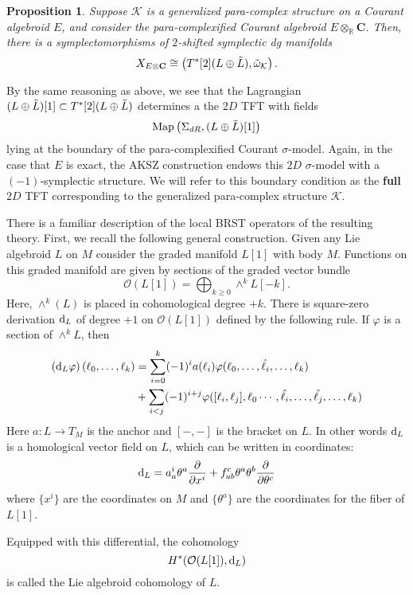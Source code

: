 \documentclass[letterpaper,12pt]{article}
\newcommand{\KK}{\mathcal{K}}
\newcommand{\Cc}{\mathbf{C}}
\newcommand{\RR}{\mathbb{R}}
\newcommand{\cO}{\mathcal{O}}
\def\d{{\rm d}}
\newtheorem{proposition}[theorem]{Proposition}
\theoremstyle{definition}
\theoremstyle{remark}
\theoremstyle{examples}
\begin{document}
\begin{proposition}\label{prop: complexifiedsymp}
Suppose $\KK$ is a generalized para-complex structure on a Courant algebroid $E$, and consider the para-complexified Courant algebroid $E \otimes_{\RR} \Cc$. 
Then, there is a symplectomorphisms of $2$-shifted symplectic dg manifolds
\[
X_{E\otimes \Cc} \cong \left(T^*[2] (L \oplus \Tilde{L}), \Tilde{\omega}_{\KK} \right) .
\]
\end{proposition}

By the same reasoning as above, we see that the Lagrangian $(L \oplus \Tilde{L})[1] \subset T^*[2] (L \oplus \Tilde{L})$ determines a the $2D$ TFT with fields
\[
{\rm Map} \left(\Sigma_{dR}, (L \oplus \Tilde{L})[1]\right)
\]
lying at the boundary of the para-complexified Courant $\sigma$-model. 
Again, in the case that $E$ is exact, the AKSZ construction endows this $2D$ $\sigma$-model with a $(-1)$-symplectic structure. 
We will refer to this boundary condition as the {\bf full} $2D$ TFT corresponding to the generalized para-complex structure $\KK$. 

There is a familiar description of the local BRST operators of the resulting theory.
First, we recall the following general construction.
Given any Lie algebroid $L$ on $M$ consider the graded manifold $L[1]$ with body $M$. 
Functions on this graded manifold are given by sections of the graded vector bundle
\[
\cO(L[1]) = \bigoplus_{k \geq 0} \wedge^k L [-k] .
\]
Here, $\wedge^k(L)$ is placed in cohomological degree $+k$. 
There is square-zero derivation $\d_L$ of degree $+1$ on $\cO(L[1])$ defined by the following rule. 
If $\varphi$ is a section of $\wedge^k L$, then
\begin{align*}
\left( \d_L \varphi \right) (\ell_0, \ldots, \ell_k) & = \sum_{i = 0}^k (-1)^i a (\ell_i) \varphi(\ell_0, \ldots, \Hat{\ell_i}, \ldots, \ell_k) \\ & + \sum_{i < j} (-1)^{i+j} \varphi([\ell_i, \ell_j] , \ell_0 \cdots, \Hat{\ell_i}, \ldots, \Hat{\ell_j}, \ldots, \ell_k)
\end{align*}
Here $a : L \to T_M$ is the anchor and $[-,-]$ is the bracket on $L$. 
In other words $\d_L$ is a homological vector field on $L$, which can be written in coordinates:
\[
\d_L = a_a^i \theta^a \frac{\partial}{\partial x^i} + f_{ab}^c \theta^a \theta^b \frac{\partial}{\partial \theta^c}
\]
where $\{x^i\}$ are the coordinates on $M$ and $\{\theta^a\}$ are the coordinates for the fiber of $L[1]$.

Equipped with this differential, the cohomology
\[
H^*( \cO(L[1]), \d_L )
\]
is called the Lie algebroid cohomology of $L$.
\end{document}
